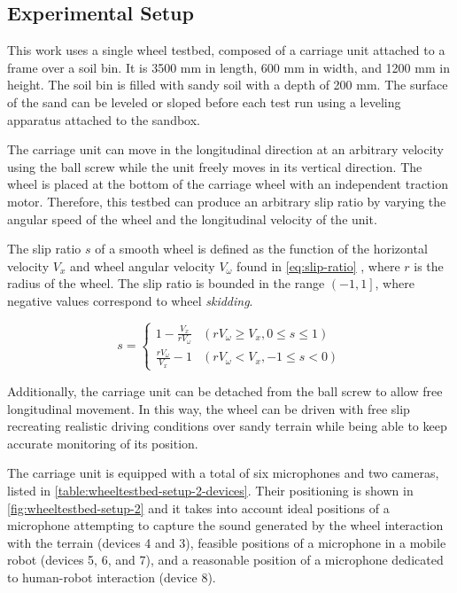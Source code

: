 \subsection{Experimental Setup} \label{subsec:experimental-setup}


This work uses a single wheel testbed, composed of a carriage unit attached to
a frame over a soil bin. It is 3500 mm in length, 600 mm in width, and 1200 mm
in height. The soil bin is filled with sandy soil with a depth of 200 mm. The
surface of the sand can be leveled or sloped before each test run using a
leveling apparatus attached to the sandbox.

The carriage unit can move in the longitudinal direction at an arbitrary
velocity using the ball screw while the unit freely moves in its vertical
direction. The wheel is placed at the bottom of the carriage wheel with an
independent traction motor. Therefore, this testbed can produce an arbitrary
slip ratio by varying the angular speed of the wheel and the longitudinal
velocity of the unit. 

The slip ratio $s$ of a smooth wheel is defined as the function of the
horizontal velocity $V_x$ and wheel angular velocity $V_\omega$ found in
\cref{eq:slip-ratio} \cite{Slip2009}, where $r$ is the radius of the wheel. The
slip ratio is bounded in the range $\left(-1,1\right]$, where negative values
correspond to wheel \emph{skidding}.

\begin{equation}
    s  = \begin{cases} 
        1 - \frac{V_x}{r V_\omega} & (r V_\omega \geq V_x, 0 \leq s \leq 1) \\
        \frac{r V_\omega}{V_x} - 1 & (r V_\omega < V_x, -1 \leq s < 0)
    \end{cases}
    \label{eq:slip-ratio}
\end{equation}

Additionally, the carriage unit can be detached from the ball screw to allow
free longitudinal movement. In this way, the wheel can be driven with free slip
recreating realistic driving conditions over sandy terrain while being able to
keep accurate monitoring of its position.

The carriage unit is equipped with a total of six microphones and two cameras,
listed in \cref{table:wheeltestbed-setup-2-devices}. Their positioning is shown
in \cref{fig:wheeltestbed-setup-2} and it  takes into account ideal positions
of a microphone attempting to capture the sound generated by the wheel
interaction with the terrain (devices 4 and 3), feasible positions of a
microphone in a mobile robot (devices 5, 6, and 7), and a reasonable position
of a microphone dedicated to human-robot interaction (device 8).

